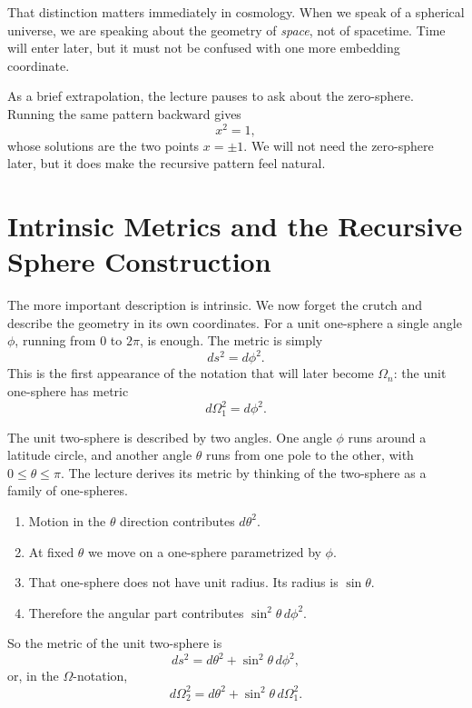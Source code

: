That distinction matters immediately in cosmology. When we speak of a spherical universe, we are speaking about the geometry of \emph{space}, not of spacetime. Time will enter later, but it must not be confused with one more embedding coordinate.

As a brief extrapolation, the lecture pauses to ask about the zero-sphere. Running the same pattern backward gives
\begin{equation}
x^2=1,
\end{equation}
whose solutions are the two points \(x=\pm 1\). We will not need the zero-sphere later, but it does make the recursive pattern feel natural.

\section{Intrinsic Metrics and the Recursive Sphere Construction}

The more important description is intrinsic. We now forget the crutch and describe the geometry in its own coordinates. For a unit one-sphere a single angle \(\phi\), running from \(0\) to \(2\pi\), is enough. The metric is simply
\begin{equation}
ds^2=d\phi^2.
\end{equation}
This is the first appearance of the notation that will later become \(\Omega_n\): the unit one-sphere has metric
\begin{equation}
d\Omega_1^2=d\phi^2.
\end{equation}

The unit two-sphere is described by two angles. One angle \(\phi\) runs around a latitude circle, and another angle \(\theta\) runs from one pole to the other, with \(0\leq \theta \leq \pi\). The lecture derives its metric by thinking of the two-sphere as a family of one-spheres.

\begin{enumerate}
\item Motion in the \(\theta\) direction contributes \(d\theta^2\).
\item At fixed \(\theta\) we move on a one-sphere parametrized by \(\phi\).
\item That one-sphere does not have unit radius. Its radius is \(\sin\theta\).
\item Therefore the angular part contributes \(\sin^2\theta\,d\phi^2\).
\end{enumerate}

So the metric of the unit two-sphere is
\begin{equation}
ds^2=d\theta^2+\sin^2\theta\,d\phi^2,
\end{equation}
or, in the \(\Omega\)-notation,
\begin{equation}
d\Omega_2^2=d\theta^2+\sin^2\theta\,d\Omega_1^2.
\end{equation}

